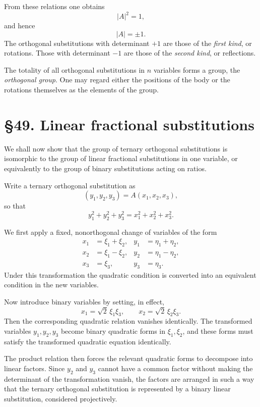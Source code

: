 \documentclass[11pt,a4paper]{book}
\newcommand{\webersection}[2]{\clearpage\section*{\S #1. #2}}
\begin{document}
From these relations one obtains
\[
|A|^2=1,
\]
and hence
\[
|A|=\pm1.
\]
The orthogonal substitutions with determinant \(+1\) are those of the \emph{first kind}, or rotations.  Those with determinant \(-1\) are those of the \emph{second kind}, or reflections.

The totality of all orthogonal substitutions in \(n\) variables forms a group, the \emph{orthogonal group}.  One may regard either the positions of the body or the rotations themselves as the elements of the group.

\webersection{49}{Linear fractional substitutions}

We shall now show that the group of ternary orthogonal substitutions is isomorphic to the group of linear fractional substitutions in one variable, or equivalently to the group of binary substitutions acting on ratios.

Write a ternary orthogonal substitution as
\begin{equation}
(y_1,y_2,y_3)=A(x_1,x_2,x_3),
\end{equation}
so that
\begin{equation}
y_1^2+y_2^2+y_3^2=x_1^2+x_2^2+x_3^2.
\end{equation}

We first apply a fixed, nonorthogonal change of variables of the form
\begin{align}
x_1&=\xi_1+\xi_2,&
y_1&=\eta_1+\eta_2,\\
x_2&=\xi_1-\xi_2,&
y_2&=\eta_1-\eta_2,\\
x_3&=\xi_3,&
y_3&=\eta_3.
\end{align}
Under this transformation the quadratic condition is converted into an equivalent condition in the new variables.

Now introduce binary variables by setting, in effect,
\[
x_1=\sqrt2\,\xi_1\xi_3,\qquad
x_2=\sqrt2\,\xi_2\xi_3.
\]
Then the corresponding quadratic relation vanishes identically.  The transformed variables \(y_1,y_2,y_3\) become binary quadratic forms in \(\xi_1,\xi_2\), and these forms must satisfy the transformed quadratic equation identically.

The product relation then forces the relevant quadratic forms to decompose into linear factors.  Since \(y_2\) and \(y_3\) cannot have a common factor without making the determinant of the transformation vanish, the factors are arranged in such a way that the ternary orthogonal substitution is represented by a binary linear substitution, considered projectively.
\end{document}
